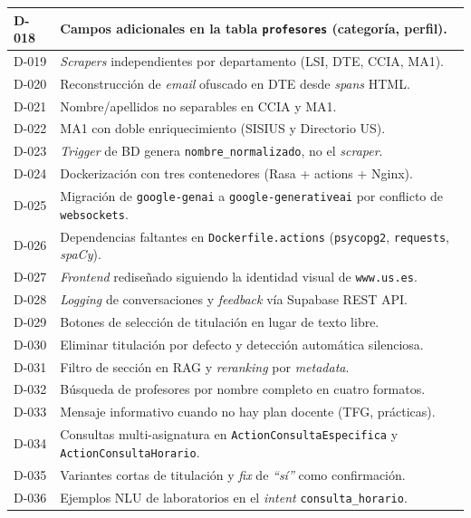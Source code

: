 \begin{longtable}{|p{1.3cm}|>{\raggedright\arraybackslash}p{12cm}|}
D-018 & Campos adicionales en la tabla \texttt{profesores} (categoría, perfil). \\ \hline
D-019 & \textit{Scrapers} independientes por departamento (LSI, DTE, CCIA, MA1). \\ \hline
D-020 & Reconstrucción de \textit{email} ofuscado en DTE desde \textit{spans} HTML. \\ \hline
D-021 & Nombre/apellidos no separables en CCIA y MA1. \\ \hline
D-022 & MA1 con doble enriquecimiento (SISIUS y Directorio US). \\ \hline
D-023 & \textit{Trigger} de BD genera \texttt{nombre\_normalizado}, no el \textit{scraper}. \\ \hline
D-024 & Dockerización con tres contenedores (Rasa + actions + Nginx). \\ \hline
D-025 & Migración de \texttt{google-genai} a \texttt{google-generativeai} por conflicto de \texttt{websockets}. \\ \hline
D-026 & Dependencias faltantes en \texttt{Dockerfile.actions} (\texttt{psycopg2}, \texttt{requests}, \textit{spaCy}). \\ \hline
D-027 & \textit{Frontend} rediseñado siguiendo la identidad visual de \texttt{www.us.es}. \\ \hline
D-028 & \textit{Logging} de conversaciones y \textit{feedback} vía Supabase REST API. \\ \hline
D-029 & Botones de selección de titulación en lugar de texto libre. \\ \hline
D-030 & Eliminar titulación por defecto y detección automática silenciosa. \\ \hline
D-031 & Filtro de sección en RAG y \textit{reranking} por \textit{metadata}. \\ \hline
D-032 & Búsqueda de profesores por nombre completo en cuatro formatos. \\ \hline
D-033 & Mensaje informativo cuando no hay plan docente (TFG, prácticas). \\ \hline
D-034 & Consultas multi-asignatura en \texttt{ActionConsultaEspecifica} y \texttt{ActionConsultaHorario}. \\ \hline
D-035 & Variantes cortas de titulación y \textit{fix} de \textit{``sí''} como confirmación. \\ \hline
D-036 & Ejemplos NLU de laboratorios en el \textit{intent} \texttt{consulta\_horario}. \\ \hline
\end{longtable}

